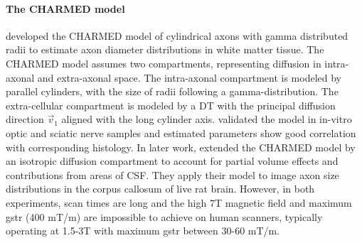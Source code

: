 \paragraph*{The CHARMED model} 
\citet{Assaf:2005} developed the \gls{CHARMED} model of cylindrical axons with gamma distributed radii to estimate axon diameter distributions in white matter tissue. The \gls{CHARMED} model assumes two compartments, representing diffusion in intra-axonal and extra-axonal space. The intra-axonal compartment is modeled by parallel cylinders, with the size of radii following a gamma-distribution. The extra-cellular compartment is modeled by a {\gls{DT}} with the principal diffusion direction $\vec{v}_1$ aligned with the long cylinder axis. \citet{Alexander:2008} validated the model in in-vitro optic and sciatic nerve samples and estimated parameters show good correlation with corresponding histology. In later work, \citet{Barazany:2009} extended the \gls{CHARMED} model by an isotropic diffusion compartment to account for partial volume effects and contributions from areas of {\gls{CSF}}. They apply their model to image axon size distributions in the corpus callosum of live rat brain. However, in both experiments, scan times are long and the high 7T magnetic field and maximum {\gls{gstr}} (400 mT/m) are impossible to achieve on human scanners, typically operating at 1.5-3T with maximum {\gls{gstr}} between 30-60 mT/m.

